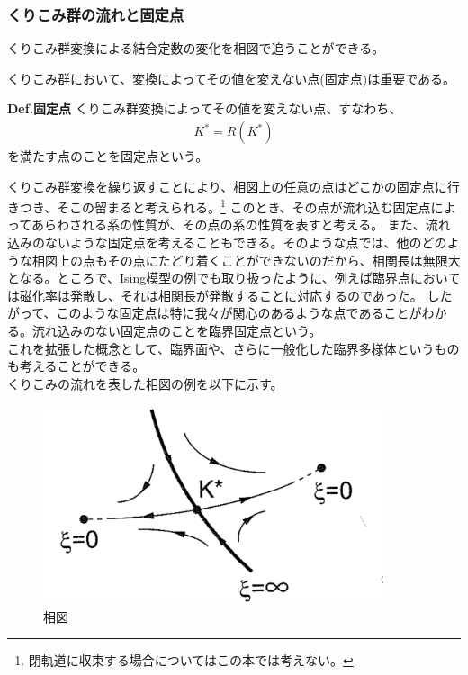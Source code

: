 \documentclass[a4paper,11pt]{jsarticle}
\numberwithin{equation}{section}
\begin{document}
\subsubsection{くりこみ群の流れと固定点}
くりこみ群変換による結合定数の変化を相図で追うことができる。

くりこみ群において、変換によってその値を変えない点(固定点)は重要である。
\begin{itembox}[l]{\textbf{Def.固定点}}
    くりこみ群変換によってその値を変えない点、すなわち、
    \begin{align}
        K^* = R(K^*)
    \end{align}
    を満たす点のことを固定点という。
\end{itembox}
くりこみ群変換を繰り返すことにより、相図上の任意の点はどこかの固定点に行きつき、そこの留まると考えられる。\footnote{閉軌道に収束する場合についてはこの本では考えない。}
このとき、その点が流れ込む固定点によってあらわされる系の性質が、その点の系の性質を表すと考える。
また、流れ込みのないような固定点を考えることもできる。そのような点では、他のどのような相図上の点もその点にたどり着くことができないのだから、相関長は無限大となる。ところで、Ising模型の例でも取り扱ったように、例えば臨界点においては磁化率は発散し、それは相関長が発散することに対応するのであった。
したがって、このような固定点は特に我々が関心のあるような点であることがわかる。流れ込みのない固定点のことを臨界固定点という。\\
これを拡張した概念として、臨界面や、さらに一般化した臨界多様体というものも考えることができる。\\
くりこみの流れを表した相図の例を以下に示す。
\begin{figure}[H]
    \begin{center}
    \includegraphics[width=100mm]{kk.png}
    \end{center}
    \caption{相図}
    \label{fig:kk}
\end{figure}
\end{document}
